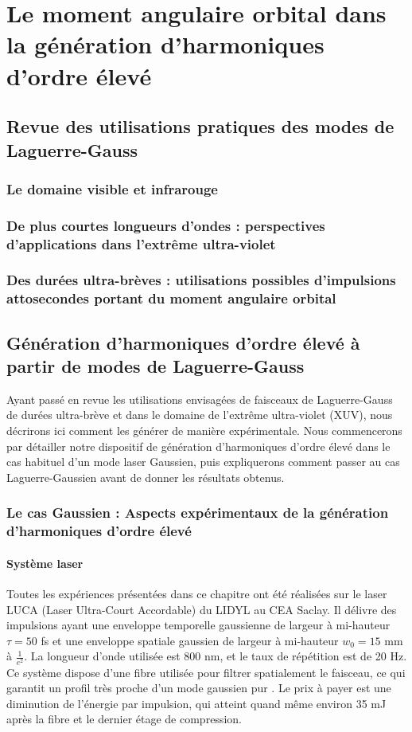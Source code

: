 \chapter{Le moment angulaire orbital dans la génération d'harmoniques d'ordre élevé}
\label{CH:OAM_HHG}
%
\section{Revue des utilisations pratiques des modes de Laguerre-Gauss}
\subsection{Le domaine visible et infrarouge}
\subsection{De plus courtes longueurs d'ondes : perspectives d'applications dans l'extrême ultra-violet}
\subsection{Des durées ultra-brèves : utilisations possibles d'impulsions attosecondes portant du moment angulaire orbital}

\section{Génération d'harmoniques d'ordre élevé à partir de modes de Laguerre-Gauss}

Ayant passé en revue les utilisations envisagées de faisceaux de Laguerre-Gauss de durées ultra-brève et dans le domaine de l'extrême ultra-violet (XUV), nous décrirons ici comment les générer de manière expérimentale. Nous commencerons par détailler notre dispositif de génération d'harmoniques d'ordre élevé dans le cas habituel d'un mode laser Gaussien, puis expliquerons comment passer au cas Laguerre-Gaussien avant de donner les résultats obtenus.

\subsection{Le cas Gaussien : Aspects expérimentaux de la génération d'harmoniques d'ordre élevé}
\subsubsection{Système laser}
Toutes les expériences présentées dans ce chapitre ont été réalisées sur le laser LUCA (Laser Ultra-Court Accordable) du LIDYL au CEA Saclay. Il délivre des impulsions ayant une enveloppe temporelle gaussienne de largeur à mi-hauteur $\tau = 50$ fs et une enveloppe spatiale gaussien de largeur à mi-hauteur $w_0 = 15$ mm à $\frac{1}{e^2}$. La longueur d'onde utilisée est 800 nm, et le taux de répétition est de 20 Hz. Ce système dispose d'une fibre utilisée pour filtrer spatialement le faisceau, ce qui garantit un profil très proche d'un mode gaussien pur . Le prix à payer est une diminution de l'énergie par impulsion, qui atteint quand même environ 35 mJ après la fibre et le dernier étage de compression.

